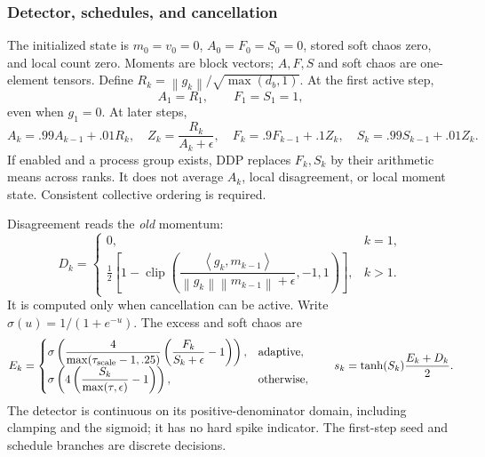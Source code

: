 \documentclass[11pt,a4paper]{article}
\theoremstyle{definition}
\theoremstyle{remark}
\newcommand{\norm}[1]{\left\lVert#1\right\rVert}
\newcommand{\ip}[2]{\left\langle#1,#2\right\rangle}
\newcommand{\clip}{\operatorname{clip}}
\begin{document}
\subsubsection{Detector, schedules, and cancellation}
The initialized state is $m_0=v_0=0$, $A_0=F_0=S_0=0$, stored soft chaos zero,
and local count zero. Moments are block vectors; $A,F,S$ and soft chaos are
one-element tensors. Define $R_k=\norm{g_k}/\sqrt{\max(d_b,1)}$. At the first
active step,
\begin{equation}\label{eq:seed}
 A_1=R_1,\qquad F_1=S_1=1,
\end{equation}
even when $g_1=0$. At later steps,
\begin{equation}\label{eq:ema}
 A_k=.99 A_{k-1}+.01R_k,\quad Z_k=\frac{R_k}{A_k+\epsilon},\quad
 F_k=.9F_{k-1}+.1Z_k,\quad S_k=.99S_{k-1}+.01Z_k.
\end{equation}
If enabled and a process group exists, DDP replaces $F_k,S_k$ by their
arithmetic means across ranks. It does not average $A_k$, local disagreement,
or local moment state. Consistent collective ordering is required.

Disagreement reads the \emph{old} momentum:
\begin{equation}\label{eq:disagreement}
 D_k=\begin{cases}0,&k=1,\\
 \frac12\left[1-\clip\left(
 \dfrac{\ip{g_k}{m_{k-1}}}{\norm{g_k}\norm{m_{k-1}}+\epsilon},-1,1\right)\right],&k>1.
 \end{cases}
\end{equation}
It is computed only when cancellation can be active. Write $\sigma(u)=1/(1+e^{-u})$.
The excess and soft chaos are
\begin{equation}\label{eq:soft}
 E_k=\begin{cases}
 \sigma\left(\dfrac{4}{\max(\tau_{\rm scale}-1,.25)}
       \left(\dfrac{F_k}{S_k+\epsilon}-1\right)\right),&\text{adaptive},\\
 \sigma\left(4\left(\dfrac{S_k}{\max(\tau,\epsilon)}-1\right)\right),&\text{otherwise},
 \end{cases}
 \qquad s_k=\tanh(S_k)\frac{E_k+D_k}{2}.
\end{equation}
The detector is continuous on its positive-denominator domain, including
clamping and the sigmoid; it has no hard spike indicator. The first-step seed
and schedule branches are discrete decisions.
\end{document}
